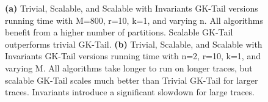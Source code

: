 \begin{figure}[!t]
\centering
{}
\caption{\textbf{(a)} Trivial, Scalable, and Scalable with Invariants
  GK-Tail versions running time with M=800, r=10, k=1, and varying
  n. All algorithms benefit from a higher number of
  partitions. Scalable GK-Tail outperforms trivial
  GK-Tail. \textbf{(b)} Trivial, Scalable, and Scalable with
  Invariants GK-Tail versions running time with n=2, r=10, k=1, and
  varying M. All algorithms take longer to run on longer traces, but
  scalable GK-Tail scales much better than Trivial GK-Tail for larger
  traces. Invariants introduce a significant slowdown for large
  traces.}
\label{fig:perf1}
\end{figure}

